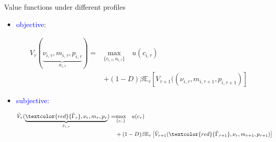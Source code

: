 \documentclass{beamer}
\begin{document}
\begin{frame}{Value functions under different profiles}
	\begin{itemize}
		\item \textcolor{blue}{objective}: 
		
		\begin{equation*}
			\begin{split}
				V_{\tau}(\underbrace{\nu_{i,\tau}, m_{i,\tau}, p_{i,\tau}}_{x_{i,\tau}})  =  & \underset{\{c_{i,\tau},a_{i,\tau}\}}{\textrm{max}} \quad   u(c_{i,\tau}) \\
		& +  (1-D)\beta \mathbb{E}_{\tau}\left[V_{\tau+1}((\nu_{i,\tau},m_{i,\tau+1}, p_{i,\tau+1})\right] 
			\end{split}
		\end{equation*}
		\item \textcolor{blue}{subjective}: 
		
		\begin{equation*}
			\begin{split}
				\tilde V_{\tau}(\underbrace{\textcolor{red}{\tilde \Gamma_\tau}, \nu_\tau, m_\tau, p_\tau}_{\tilde x_{i,\tau}}) = & \underset{\{c_\tau\}}{\textrm{max}} \quad  u(c_\tau) \\
				&  + (1-D)\beta \mathbb{E}_{\tau}\left[\tilde V_{\tau+1}(\textcolor{red}{\tilde \Gamma_{\tau+1}}, \nu_\tau,m_{\tau+1}, p_{\tau+1})\right] 
			\end{split}
		\end{equation*}
	\end{itemize}
\end{frame}
\end{document}
